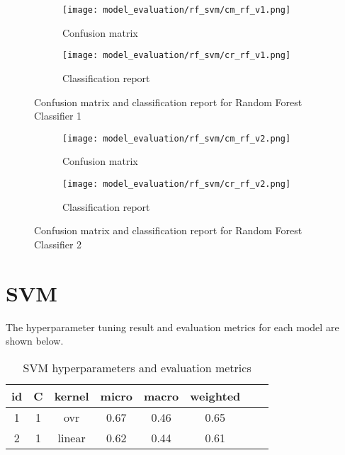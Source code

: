 \begin{figure}[H]
    \centering
    \begin{subfigure}[b]{0.5\textwidth}
        \texttt{[image: model\_evaluation/rf\_svm/cm\_rf\_v1.png]}
        \caption{Confusion matrix}
    \end{subfigure}
    \hfill
    \begin{subfigure}[b]{0.4\textwidth}
        \texttt{[image: model\_evaluation/rf\_svm/cr\_rf\_v1.png]}
        \caption{Classification report}
    \end{subfigure}
    \caption{Confusion matrix and classification report for Random Forest Classifier 1}
\end{figure}

\begin{figure}[H]
    \centering
    \begin{subfigure}[b]{0.5\textwidth}
        \texttt{[image: model\_evaluation/rf\_svm/cm\_rf\_v2.png]}
        \caption{Confusion matrix}
    \end{subfigure}
    \hfill
    \begin{subfigure}[b]{0.4\textwidth}
        \texttt{[image: model\_evaluation/rf\_svm/cr\_rf\_v2.png]}
        \caption{Classification report}
    \end{subfigure}
    \caption{Confusion matrix and classification report for Random Forest Classifier 2}
\end{figure}


\section{SVM}
The hyperparameter tuning result and evaluation metrics for each model are shown below.
\begin{table}[H]
    \begin{center}
        \begin{tabular}{ |c|c|c|c|c|c|c|c| }
            \hline
            id & C & kernel &  micro & macro & weighted \\
            \hline
            1 & 1 & ovr & 0.67 & 0.46  & 0.65     \\
            \hline        
            2 & 1 & linear  & 0.62  & 0.44 & 0.61     \\
            \hline
        \end{tabular}
    \end{center}
    \caption{SVM hyperparameters and evaluation metrics}
\end{table}


